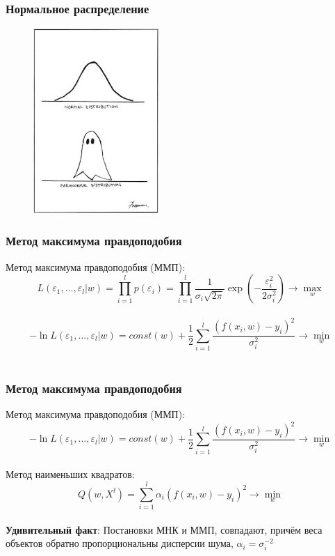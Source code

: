 \documentclass[10pt]{beamer}
\begin{document}
\begin{frame}\frametitle{Нормальное распределение}
	\begin{figure}[htbp]
	  \includegraphics[height=200pt, keepaspectratio = true]{images/paranormal}   
	\end{figure}
\end{frame}

\begin{frame}\frametitle{Метод максимума правдоподобия}
	Метод максимума правдоподобия (ММП):\\
	$$L(\varepsilon_1, \dots, \varepsilon_l | w) = \prod\limits_{i=1}^l p(\varepsilon_i) = \prod\limits_{i=1}^l \frac{1}{\sigma_i \sqrt{2\pi}} \exp (-\frac{\varepsilon_i^2}{2\sigma_i^2}  ) \rightarrow \max\limits_{w}$$\\
	$$- \ln L(\varepsilon_1, \dots, \varepsilon_l| w) = const(w) + \frac{1}{2} \sum\limits_{i=1}^l \frac{(f(x_i, w) - y_i)^2}{\sigma_i^2}  \rightarrow \min\limits_{w}$$\\
\end{frame}

\begin{frame}\frametitle{Метод максимума правдоподобия}
	Метод максимума правдоподобия (ММП):\\
	$$- \ln L(\varepsilon_1, \dots, \varepsilon_l| w) = const(w) + \frac{1}{2} \sum\limits_{i=1}^l \frac{(f(x_i, w) - y_i)^2}{\sigma_i^2}  \rightarrow \min\limits_{w}$$\\
	\vspace{2mm}
	Метод наименьших квадратов: $$Q(w,X^l) = \sum\limits_{i=1}^l \alpha_i (f (x_i, w) - y_i)^2 \rightarrow \min\limits_{w}$$\\
	\bigbreak
	\textbf{Удивительный факт}: Постановки МНК и ММП, совпадают, причём веса объектов
	обратно пропорциональны дисперсии шума, $\alpha_i = \sigma_i^{-2}$
\end{frame}
\end{document}
